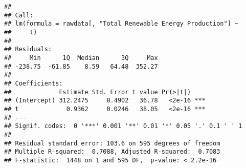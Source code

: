 \documentclass[
]{article}
\newenvironment{Shaded}{\begin{snugshade}}{\end{snugshade}}
\newcommand{\CommentTok}[1]{\textcolor[rgb]{0.56,0.35,0.01}{\textit{#1}}}
\newcommand{\DecValTok}[1]{\textcolor[rgb]{0.00,0.00,0.81}{#1}}
\newcommand{\FunctionTok}[1]{\textcolor[rgb]{0.00,0.00,0.00}{#1}}
\newcommand{\NormalTok}[1]{#1}
\newcommand{\OtherTok}[1]{\textcolor[rgb]{0.56,0.35,0.01}{#1}}
\newcommand{\SpecialCharTok}[1]{\textcolor[rgb]{0.00,0.00,0.00}{#1}}
\newcommand{\StringTok}[1]{\textcolor[rgb]{0.31,0.60,0.02}{#1}}
\begin{document}
\begin{Shaded}
\end{Shaded}

\begin{verbatim}
## 
## Call:
## lm(formula = rawdata[, "Total Renewable Energy Production"] ~ 
##     t)
## 
## Residuals:
##     Min      1Q  Median      3Q     Max 
## -238.75  -61.85    8.59   64.48  352.27 
## 
## Coefficients:
##             Estimate Std. Error t value Pr(>|t|)    
## (Intercept) 312.2475     8.4902   36.78   <2e-16 ***
## t             0.9362     0.0246   38.05   <2e-16 ***
## ---
## Signif. codes:  0 '***' 0.001 '**' 0.01 '*' 0.05 '.' 0.1 ' ' 1
## 
## Residual standard error: 103.6 on 595 degrees of freedom
## Multiple R-squared:  0.7088, Adjusted R-squared:  0.7083 
## F-statistic:  1448 on 1 and 595 DF,  p-value: < 2.2e-16
\end{verbatim}

\begin{Shaded}
\end{Shaded}
\end{document}
